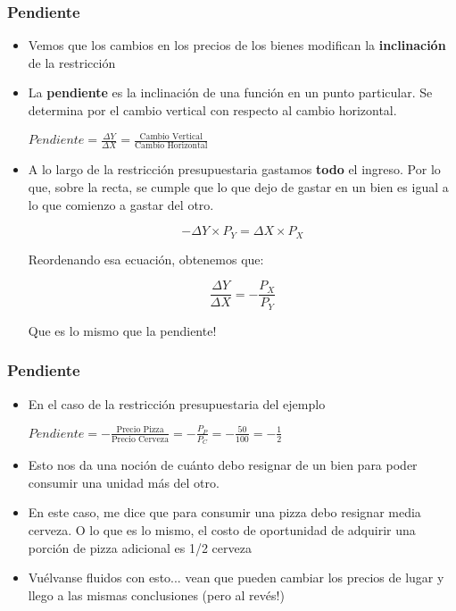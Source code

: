 \documentclass{beamer}
\begin{document}
\begin{frame}
\frametitle{Pendiente}
\begin{itemize}
    \item Vemos que los cambios en los precios de los bienes modifican la \textbf{inclinación} de la restricción 
    \item La \textbf{pendiente} es la inclinación de una función en un punto particular. Se determina por el cambio vertical con respecto al cambio horizontal. \\ 
     \begin{center}
        $Pendiente =\frac{\Delta Y}{\Delta X} = \frac{\text{Cambio Vertical}}
    {\text{Cambio Horizontal}}$
    \end{center}
    \vspace{1mm}
    \item A lo largo de la restricción presupuestaria gastamos \textbf{todo} el ingreso. Por lo que, sobre la recta, se cumple que lo que dejo de gastar en un bien es igual a lo que comienzo a gastar del otro. 
    \vspace{-7mm}
    \begin{center}
    \[-\Delta Y \times P_Y = \Delta X \times P_X \]
    \end{center}
    \vspace{-4mm}
    Reordenando esa ecuación, obtenemos que:     \vspace{-5mm}
    \begin{center}
    \[\frac{\Delta Y}{\Delta X} = -\frac{P_X}{P_Y} \]
    \end{center}
    Que es lo mismo que la pendiente!

\end{itemize} 
\end{frame}

\begin{frame}
\frametitle{Pendiente}
    \begin{itemize}
        \item En el caso de la restricción presupuestaria del ejemplo \\
        \vspace{2mm}
        \begin{center}
            $Pendiente = - \frac{\text{Precio Pizza}}{\text{Precio Cerveza}}= -\frac{P_P}{P_C} = -\frac{50}{100} = -\frac{1}{2}$
        \end{center}
        \vspace{2mm}
        \item Esto nos da una noción de cuánto debo resignar de un bien para poder consumir una unidad más del otro.
        \item En este caso, me dice que para consumir una pizza debo resignar media cerveza. O lo que es lo mismo, el costo de oportunidad de adquirir una porción de pizza adicional es 1/2 cerveza
        \item Vuélvanse fluidos con esto... vean que pueden cambiar los precios de lugar y llego a las mismas conclusiones (pero al revés!)
    \end{itemize}
\end{frame}
\end{document}
